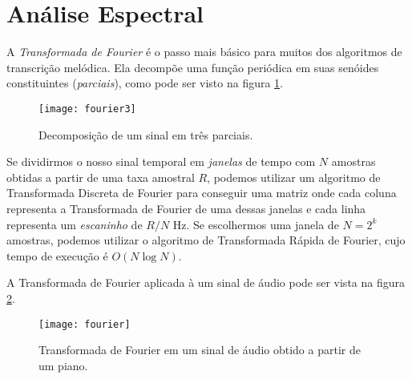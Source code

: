 \section{Análise Espectral}
\label{sec:fourier}

A \emph{Transformada de Fourier} é o passo mais básico para muitos dos algoritmos de transcrição melódica. Ela decompõe uma função periódica em suas senóides constituintes (\emph{parciais}), como pode ser visto na figura \ref{fig:fourier3}.

\begin{figure}%
\centering
\texttt{[image: fourier3]}
\caption{Decomposição de um sinal em três parciais.}
\label{fig:fourier3}
\end{figure}

Se dividirmos o nosso sinal temporal em \emph{janelas} de tempo com $N$ amostras obtidas a partir de uma taxa amostral $R$, podemos utilizar um algoritmo de Transformada Discreta de Fourier para conseguir uma matriz onde cada coluna representa a Transformada de Fourier de uma dessas janelas e cada linha representa um \emph{escaninho} de $R/N$ Hz. Se escolhermos uma janela de $N=2^k$ amostras, podemos utilizar o algoritmo de Transformada Rápida de Fourier, cujo tempo de execução é $O(N\log{}N)$.

A Transformada de Fourier aplicada à um sinal de áudio pode ser vista na figura \ref{fig:fourier}.

\begin{figure}%
\centering
\texttt{[image: fourier]}
\caption{Transformada de Fourier em um sinal de áudio obtido a partir de um piano.}
\label{fig:fourier}
\end{figure}

